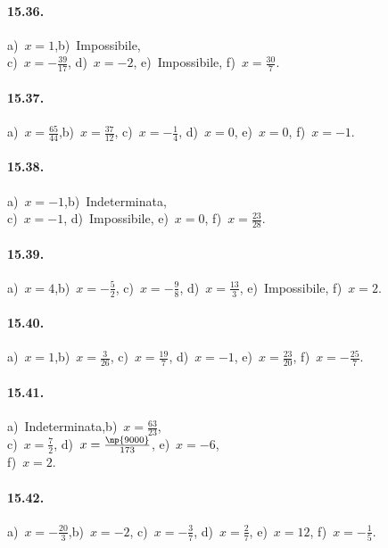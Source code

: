 \begin{multicols}{2}
\paragraph{15.36.}
a)~$x=1$,\quad b)~Impossibile,\protect\\ c)~$x=-{\frac{39}{17}}$, \quad d)~$x=-2$, \quad e)~Impossibile, \quad f)~$x=\frac{30}{7}$.

\paragraph{15.37.}
a)~$x=\frac{65}{44}$,\quad b)~$x=\frac{37}{12}$, \quad c)~$x=-{\frac{1}{4}}$, \quad d)~$x=0$, \quad e)~$x=0$, \quad f)~$x=-1$.

\paragraph{15.38.}
a)~$x=-1$,\quad b)~Indeterminata, \protect\\c)~$x=-1$, \quad d)~Impossibile, \quad e)~$x=0$, \quad f)~$x=\frac{23}{28}$.

\paragraph{15.39.}
a)~$x=4$,\quad b)~$x=-{\frac{5}{2}}$, \quad c)~$x=-{\frac{9}{8}}$, \quad d)~$x=\frac{13}{3}$, \quad e)~Impossibile, \quad f)~$x=2$.

\paragraph{15.40.}
a)~$x=1$,\quad b)~$x=\frac{3}{26}$, \quad c)~$x=\frac{19}{7}$, \quad d)~$x=-1$, \quad e)~$x=\frac{23}{20}$, \quad f)~$x=-{\frac{25}{7}}$.

\paragraph{15.41.}
a)~Indeterminata,\quad b)~$x=\frac{63}{23}$, \protect\\ c)~$x=\frac{7}{2}$, \quad d)~$x=\frac{\np{9000}}{173}$, \quad e)~$x=-6$, \protect\\ f)~$x=2$.

\paragraph{15.42.}
a)~$x=-{\frac{20}{3}}$,\quad b)~$x=-2$, \quad c)~$x=-{\frac{3}{7}}$, \quad d)~$x=\frac{2}{7}$, \quad e)~$x=12$, \quad f)~$x=-{\frac{1}{5}}$.
\end{multicols}
